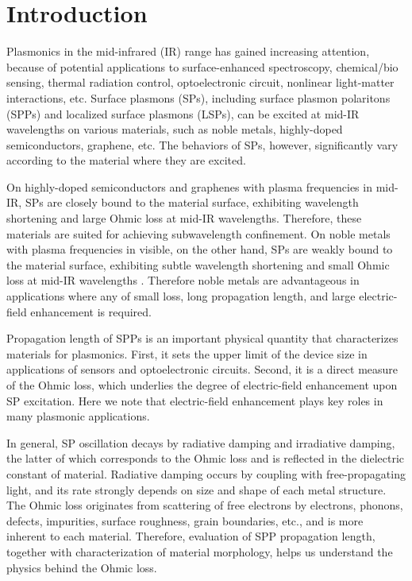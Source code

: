 \documentclass[aip,apl,reprint]{revtex4-1}
\begin{document}
\section{Introduction}
Plasmonics in the mid-infrared (IR) range has gained increasing attention\cite{Stanley, Law}, because of potential applications to surface-enhanced spectroscopy\cite{Neubrech, Hoang}, chemical/bio sensing\cite{Cleary2008}, thermal radiation control\cite{Kusunoki}, optoelectronic circuit\cite{Ebbesen, Soref}, nonlinear light-matter interactions\cite{Kusa2015}, etc. Surface plasmons (SPs), including surface plasmon polaritons (SPPs) and localized surface plasmons (LSPs), can be excited at mid-IR wavelengths on various materials, such as noble metals, highly-doped semiconductors, graphene, etc\cite{Law}. The behaviors of SPs, however, significantly vary according to the material where they are excited. 

On highly-doped semiconductors and graphenes with plasma frequencies in mid-IR\cite{Law}, SPs are closely bound to the material surface, exhibiting wavelength shortening and large Ohmic loss at mid-IR wavelengths. Therefore, these materials are suited for achieving subwavelength confinement. On noble metals with plasma frequencies in visible, on the other hand,
 SPs are weakly bound to the material surface, exhibiting subtle wavelength shortening and small Ohmic loss at mid-IR wavelengths . Therefore noble metals are advantageous in applications where any of small loss, long propagation length, and large electric-field enhancement is required\cite{Law, Kusa2014}.

Propagation length of SPPs is an important physical quantity that characterizes materials for plasmonics. First, it sets the upper limit of the device size in applications of sensors and optoelectronic circuits. Second, it is a direct measure of the Ohmic loss, which underlies the degree of electric-field enhancement upon SP excitation. Here we note that electric-field enhancement plays key roles in many plasmonic applications. 

In general, SP oscillation decays by radiative damping and irradiative damping\cite{Link}, the latter of which corresponds to the Ohmic loss and is reflected in the dielectric constant of material. Radiative damping occurs by coupling with free-propagating light, and its rate strongly depends on size and shape of each metal structure. The Ohmic loss originates from scattering of free electrons by electrons, phonons, defects, impurities, surface roughness, grain boundaries, etc., and is more inherent to each material. Therefore, evaluation of SPP propagation length, together with characterization of material morphology, helps us understand the physics behind the Ohmic loss.
\end{document}
